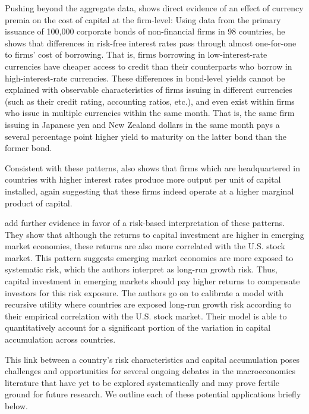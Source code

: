 \documentclass{ar-1col}
\begin{document}
Pushing beyond the aggregate data, \citet{Richers2020} shows direct evidence of an effect of currency premia on the cost of capital at the firm-level: Using data from the primary issuance of 100,000 corporate bonds of non-financial firms in 98 countries, he shows that differences in risk-free interest rates pass through almost one-for-one to firms' cost of borrowing. That is, firms borrowing in low-interest-rate currencies have cheaper access to credit than their counterparts who borrow in high-interest-rate currencies. These differences in bond-level yields cannot be explained with observable characteristics of firms issuing in different currencies (such as their credit rating, accounting ratios, etc.), and even exist within firms who issue in multiple currencies within the same month. That is, the same firm issuing in Japanese yen and New Zealand dollars in the same month pays a several percentage point higher yield to maturity on the latter bond than the former bond.

Consistent with these patterns, \citet{Richers2020} also shows that firms which are headquartered in countries with higher interest rates produce more output per unit of capital installed, again suggesting that these firms indeed operate at a higher marginal product of capital.

\citet{DavidHenriksenSimonovska2014} add further evidence in favor of a risk-based interpretation of these patterns. They show that although the returns to capital investment are higher in emerging market economies, these returns are also more correlated with the U.S. stock market. This pattern suggests emerging market economies are more exposed to systematic risk, which the authors interpret as long-run growth risk. Thus, capital investment in emerging markets should pay higher returns to compensate investors for this risk exposure. The authors go on to calibrate a model with recursive utility where countries are exposed long-run growth risk according to their empirical correlation with the U.S. stock market. Their model is able to quantitatively account for a significant portion of the variation in capital accumulation across countries.

This link between a country's risk characteristics and capital accumulation poses challenges and opportunities for several ongoing debates in the macroeconomics literature that have yet to be explored systematically and may prove fertile ground for future research. We outline each of these potential applications briefly below.
\end{document}
